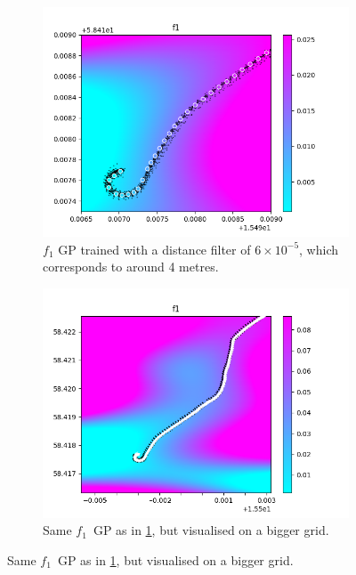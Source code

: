 \begin{figure}
    \centering
    \begin{subfigure}[b]{0.475\textwidth}
        \centering
        \includegraphics[width=\textwidth]{figures/f1_gp/f1_gp_6e-5_filter}
        \caption[Segment1]%
        {{\small $f_1$ GP trained with a distance filter of $6\times10^{-5}$, which corresponds to around 4 metres.}}    
        \label{fig:f1-gp-1}
    \end{subfigure}
    \hfill
    \begin{subfigure}[b]{0.475\textwidth}  
        \centering 
        \includegraphics[width=\textwidth]{figures/f1_gp/f1_gp_middle}
        \caption[]%
        {{\small Same $f_1$ GP as in \ref{fig:f1-gp-1}, but visualised on a bigger grid.}}    

\end{subfigure}
\end{figure}
